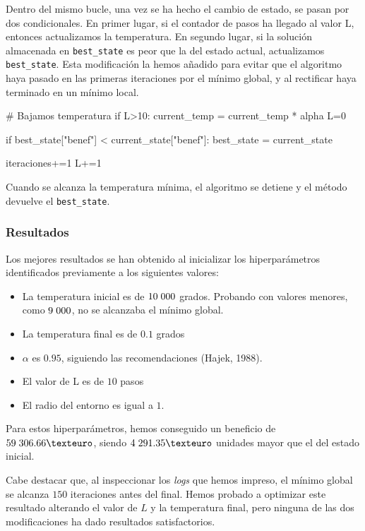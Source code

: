 \documentclass[a4paper,12pt]{article}
\begin{document}
	Dentro del mismo bucle, una vez se ha hecho el cambio de estado, se pasan por dos condicionales. En primer lugar, si el contador de pasos ha llegado al valor L, entonces
	actualizamos la temperatura. En segundo lugar, si la solución almacenada en \texttt{best\_state} es peor que la del estado actual, actualizamos \texttt{best\_state}.
	Esta modificación la hemos añadido para evitar que el algoritmo haya pasado en las primeras iteraciones por el mínimo global, y al rectificar haya terminado en un mínimo local.

	\begin{python}
	# Bajamos temperatura
	if L>10:
  		current_temp = current_temp * alpha
  		L=0

	if best_state["benef"] < current_state["benef"]:
 		best_state = current_state

	iteraciones+=1
	L+=1
	\end{python}

	Cuando se alcanza la temperatura mínima, el algoritmo se detiene y el método devuelve el \texttt{best\_state}.

	
	\subsubsection{Resultados}
	Los mejores resultados se han obtenido al inicializar los hiperparámetros identificados previamente a los siguientes valores:
	\begin{itemize}
		\item La temperatura inicial es de $10\hspace{1mm}000$ grados. Probando con valores menores, como $9\hspace{1mm}000$, no se alcanzaba el mínimo global.
		\item La temperatura final es de $0.1$ grados
		\item $\alpha$ es $0.95$, siguiendo las recomendaciones (Hajek, 1988).
		\item El valor de L es de $10$ pasos
		\item El radio del entorno es igual a $1$.
	\end{itemize}
	Para estos hiperparámetros, hemos conseguido un beneficio de $59\hspace{1mm}306.66€$, siendo $4\hspace{1mm}291.35€$ unidades mayor que el del estado inicial. 
	
	Cabe destacar que, al inspeccionar los \textit{logs} que hemos impreso, el mínimo global se alcanza $150$ iteraciones antes del final. Hemos probado a optimizar este resultado alterando el valor de $L$ y la temperatura final, pero ninguna de las dos modificaciones ha dado resultados satisfactorios. 
	
\end{document}
